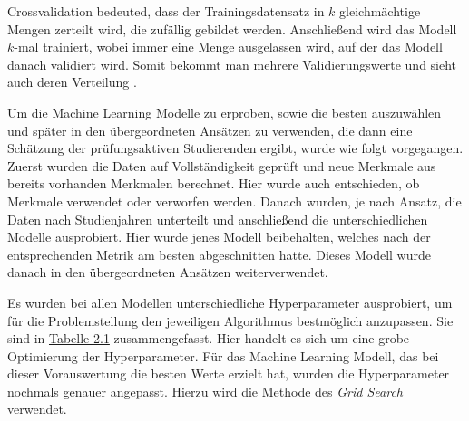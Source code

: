 Crossvalidation bedeuted, dass der Trainingsdatensatz in $k$ gleichm\"achtige Mengen zerteilt wird, die zuf\"allig gebildet werden.
Anschlie{\ss}end wird das Modell $k$-mal trainiert, wobei immer eine Menge ausgelassen wird, auf der das Modell danach validiert wird. Somit bekommt man mehrere Validierungswerte
und sieht auch deren Verteilung \cite[Seiten 31 und 32]{handson}.

Um die Machine Learning Modelle zu erproben, sowie die besten auszuw\"ahlen und sp\"ater in den \"ubergeordneten Ans\"atzen zu verwenden,
die dann eine Sch\"atzung der pr\"ufungsaktiven Studierenden ergibt, wurde wie folgt vorgegangen. Zuerst wurden die Daten auf Vollst\"andigkeit geprüft und neue
Merkmale aus bereits vorhanden Merkmalen berechnet. Hier wurde auch entschieden, ob Merkmale verwendet oder verworfen werden.
Danach wurden, je nach Ansatz, die Daten nach Studienjahren unterteilt und anschlie{\ss}end die unterschiedlichen Modelle ausprobiert. Hier wurde jenes Modell
beibehalten, welches nach der entsprechenden Metrik am besten abgeschnitten hatte.
Dieses Modell wurde danach in den \"ubergeordneten Ans\"atzen weiterverwendet.


Es wurden bei allen Modellen unterschiedliche Hyperparameter ausprobiert, um f\"ur die Problemstellung den jeweiligen
Algorithmus bestm\"oglich anzupassen. Sie sind in \hyperref[tab:hyperparameter]{Tabelle 2.1} zusammengefasst. Hier handelt es sich
um eine grobe Optimierung der Hyperparameter. F\"ur das Machine Learning Modell, das bei dieser Vorauswertung die besten Werte erzielt hat,
wurden die Hyperparameter nochmals genauer angepasst. Hierzu wird die Methode des \textit{Grid Search} verwendet.

